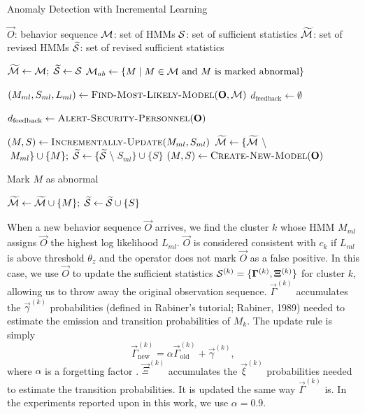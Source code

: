 \begin{algorithm}
  \caption{Anomaly Detection with Incremental Learning}
  \label{anomaly-detection-with-iml-algorithm}
  \begin{algorithmic}
    \REQUIRE $\vec{O}$: behavior sequence 
    \REQUIRE ${\cal M}$: set of HMMs 
    \REQUIRE ${\cal S}$: set of sufficient statistics 
    \ENSURE $\widetilde{\cal M}$: set of revised HMMs 
    \ENSURE $\widetilde{\cal S}$: set of revised sufficient statistics
	
    \STATE $\widetilde{\cal M} \gets {\cal M}; \; \widetilde{\cal S} \gets {\cal S}$
    \STATE ${\cal M}_{ab} \gets \{ M \mid M \in {\cal M} \text{~and $M$ is marked abnormal} \}$ 
		
    \STATE $( M_{ml}, S_{ml}, L_{ml} ) \gets
    \textsc{Find-Most-Likely-Model}(\vec{O}, {\cal M})$ 
    \STATE $d_{\text{feedback}} \gets \emptyset$
		
      \STATE $d_{\text{feedback}} \gets \textsc{Alert-Security-Personnel}(\vec{O})$
    \ENDIF

      \STATE $( M, S ) \gets \textsc{Incrementally-Update}(M_{ml}, S_{ml})$ 
      \STATE $\widetilde{\cal M} \gets \{ \widetilde{\cal
      M}\;$\textbackslash$\;M_{ml} \} \cup \{ M \}; \; \widetilde{\cal S} \gets \{ \widetilde{\cal
      S}\;$\textbackslash$\;S_{ml} \} \cup \{ S \}$ 
    \ELSE 
      \STATE $( M, S ) \gets \textsc{Create-New-Model}(\vec{O})$

        \STATE Mark $M$ as abnormal 
      \ENDIF

      \STATE $\widetilde{\cal M} \gets \widetilde{\cal M} \cup \{ M \}; \; \widetilde{\cal S} \gets \widetilde{\cal S} \cup \{ S \}$ 
    \ENDIF
  \end{algorithmic}
\end{algorithm}

When a new behavior sequence $\vec{O}$ arrives, we find the cluster
$k$ whose HMM $M_{ml}$ assigns $\vec{O}$ the highest log likelihood
$L_{ml}$. $\vec{O}$ is considered consistent with $c_k$ if $L_{ml}$ is
above threshold $\theta_z$ and the operator does not mark $\vec{O}$ as
a false positive.  In this case, we use $\vec{O}$ to update the
sufficient statistics ${\cal S}^{(k)} = \{ \vec{\Gamma}^{(k)},
\vec{\Xi}^{(k)} \}$ for cluster $k$, allowing us to throw away the
original observation sequence.  $\vec{\Gamma}^{(k)}$ accumulates the
$\vec{\gamma}^{(k)}$ probabilities (defined in Rabiner's tutorial;
Rabiner, 1989\nocite{rabiner89hmm}) needed to estimate the emission
and transition probabilities of $M_k$.  The update rule is simply
\[
  \vec{\Gamma}_{\text{new}}^{(k)} = \alpha
  \vec{\Gamma}_{\text{old}}^{(k)} + \vec{\gamma}^{(k)},
\]
where $\alpha$ is a forgetting factor .
$\vec{\Xi}^{(k)}$ accumulates the $\vec{\xi}^{(k)}$ probabilities
needed to estimate the transition probabilities.  It is updated the
same way $\vec{\Gamma}^{(k)}$ is. In the experiments reported upon in
this work, we use $\alpha = 0.9$.

